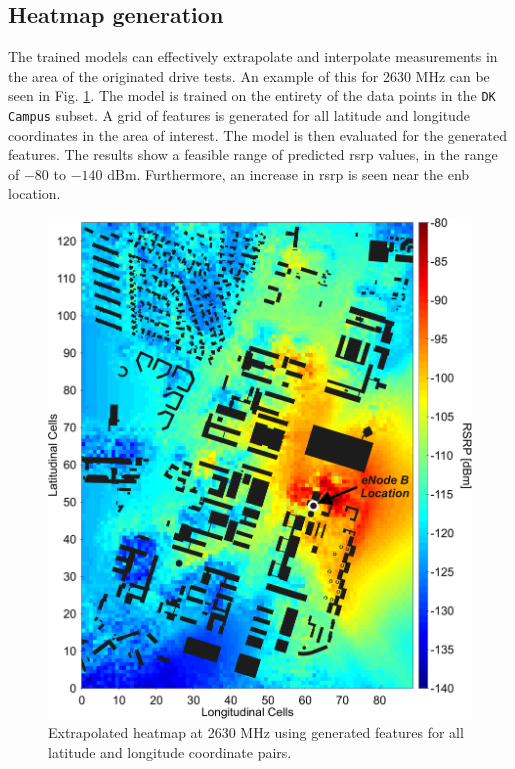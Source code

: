 \subsection{Heatmap generation}

The trained models can effectively extrapolate and interpolate measurements in the area of the originated drive tests. An example of this for 2630 MHz can be seen in Fig. \ref{fig:osm_heatmap}. The model is trained on the entirety of the data points in the \texttt{DK Campus} subset. A grid of features is generated for all latitude and longitude coordinates in the area of interest. The model is then evaluated for the generated features. The results show a feasible range of predicted \gls{rsrp} values, in the range of $-80$ to $-140$ dBm. Furthermore, an increase in \gls{rsrp} is seen near the \gls{enb} location. 

\begin{figure}[!h]
    \centering
    \includegraphics{chapters/part_pathloss/osm_images_paper/figures/heatmap.pdf}
    \caption{Extrapolated heatmap at 2630 MHz using generated features for all latitude and longitude coordinate pairs.}
    \label{fig:osm_heatmap}
\end{figure}

